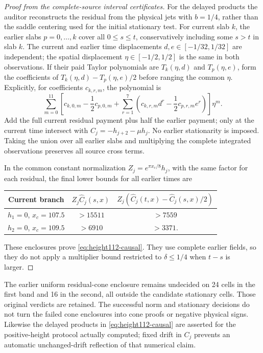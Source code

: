 \documentclass[11pt]{article}
\numberwithin{equation}{section}
\theoremstyle{definition}
\theoremstyle{remark}
\begin{document}
\begin{proof}[Proof from the complete-source interval certificates]
For the delayed products the auditor reconstructs the residual from the
physical jets with $b=1/4$, rather than the saddle centering used for
the initial stationary test.  For current slab $k$, the earlier slabs
$p=0,\ldots,k$ cover all $0\le s\le t$, conservatively including
some $s>t$ in slab $k$.  The current and earlier time displacements
$d,e\in[-1/32,1/32]$ are independent; the spatial displacement
$\eta\in[-1/2,1/2]$ is the same in both observations.  If their paid
Taylor polynomials are $T_k(\eta,d)$ and $T_p(\eta,e)$, form the
coefficients of $T_k(\eta,d)-T_p(\eta,e)/2$ before ranging the common
$\eta$.  Explicitly, for coefficients $c_{k,r,m}$, the polynomial is
\[
 \sum_{m=0}^{11}\left[c_{k,0,m}-\frac12c_{p,0,m}
 +\sum_{r=1}^{7}\left(c_{k,r,m}d^r-\frac12c_{p,r,m}e^r\right)
 \right]\eta^m.
\]
Add the full current residual payment plus half the earlier payment;
only at the current time intersect with
$C_j=-h_{j+2}-\mu h_j$.  No earlier stationarity is imposed.
Taking the union over all earlier slabs and multiplying the complete
integrated observations preserves all source cross terms.

In the common constant normalization $Z_j=e^{\pi x_c/8}h_j$, with
the same factor for each residual, the final lower bounds for all
earlier times are
\begin{center}
\begin{tabular}{ccc}
Current branch&$Z_j\widehat C_j(s,x)$&
$Z_j(\widehat C_j(t,x)-\widehat C_j(s,x)/2)$\\\hline
$h_1=0$, $x_c=107.5$&$>15511$&$>7559$\\
$h_2=0$, $x_c=109.5$&$>6910$&$>3371$.
\end{tabular}
\end{center}
These enclosures prove \eqref{eq:height112-causal}.  They use complete
earlier fields, so they do not apply a multiplier bound restricted to
$\delta\le1/4$ when $t-s$ is larger.
\end{proof}

The earlier uniform residual-cone enclosure remains undecided on 24
cells in the first band and 16 in the second, all outside the candidate
stationary cells.  Those original verdicts are retained.  The successful
norm and stationary decisions do not turn the failed cone enclosures
into cone proofs or negative physical signs.  Likewise the delayed
products in \eqref{eq:height112-causal} are asserted for the positive-height
protocol actually computed; fixed drift in $C_j$ prevents an automatic
unchanged-drift reflection of that numerical claim.
\end{document}

